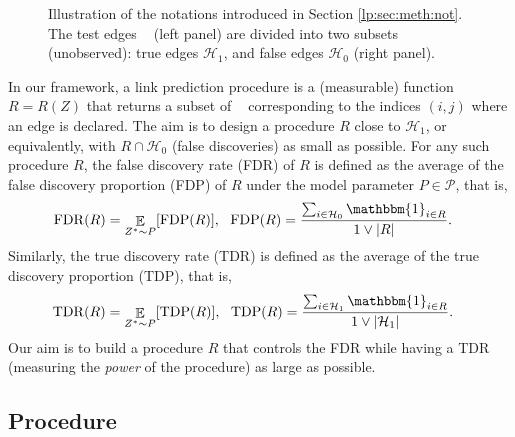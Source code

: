 \documentclass[a4paper, 11pt]{article}
\theoremstyle{remark}
\DeclareMathOperator{\ind}{\mathbbm{1}}
\DeclareMathOperator{\E}{\mathbb{E}}
\DeclareMathOperator{\FDR}{FDR}
\DeclareMathOperator{\FDP}{FDP}
\DeclareMathOperator{\TDR}{TDR}
\DeclareMathOperator{\TDP}{TDP}
\DeclareMathOperator{\Dtest}{\cD_{\text{test}}}
\newcommand{\EM}{\ensuremath}
\newcommand{\cD}{\EM{\mathcal{D}}}
\newcommand{\cH}{\EM{\mathcal{H}}}
\begin{document}
\begin{figure}
\begin{minipage}{0.5\linewidth}
\end{minipage}

\caption{Illustration of the notations introduced in Section \ref{lp:sec:meth:not}. The test edges $\Dtest$ (left panel) are divided into two subsets (unobserved): true edges $\cH_1$, and false edges $\cH_0$ (right panel).  } 
\label{lp:fig:notations}
\end{figure}


In our framework, a link prediction procedure is a (measurable) function $R=R(Z)$ that returns a subset of $\Dtest$ corresponding to the indices $(i,j)$ where an edge is declared. 
The aim is to design a procedure $R$ close to $\cH_1$, or equivalently, with $R\cap \cH_0$ (false discoveries) as small as possible. 
For any such procedure $R$, the false discovery rate (FDR) of $R$ is defined as the average of the false discovery proportion (FDP) of $R$ under the model parameter $P\in \mathcal{P}$, 
that is, 
\begin{align*}
\FDR(R)&=\E_{Z^* \sim P} [\FDP(R)],\:\:\: \FDP(R)=\frac{\sum_{i\in \cH_0} \ind_{i\in R}}{1\vee |R|}.%
\end{align*}
{Similarly, the true discovery rate (TDR) is defined as the average of the true discovery proportion (TDP), that is,}
\begin{align*}
\TDR(R)&= \E_{Z^* \sim P} [\TDP(R)],\:\:\: 
\TDP(R)=\frac{\sum_{i\in \cH_1} \ind_{i\in R}}{1\vee \vert \cH_1 \vert }.%
\end{align*}
Our aim is to build a procedure $R$ that controls the FDR while having a TDR (measuring the \textit{power} of the procedure) as large as possible.


\subsection{Procedure} \label{lp:sec:meth:def}
\end{document}
